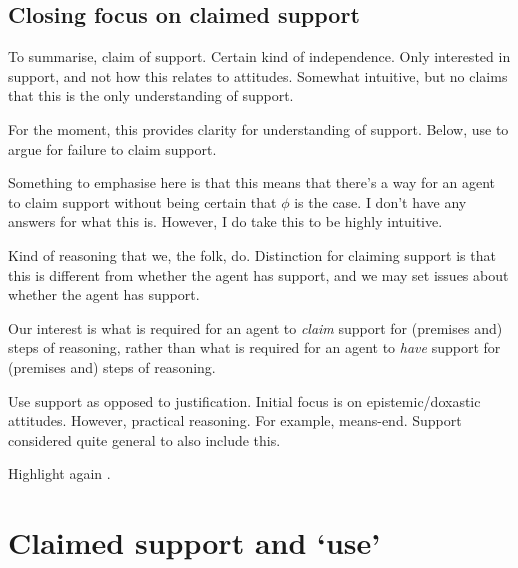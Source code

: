 \subsection{Closing focus on claimed support}

\begin{note}
  To summarise, claim of support.
  Certain kind of independence.
  Only interested in support, and not how this relates to attitudes.
  Somewhat intuitive, but no claims that this is the only understanding of support.

  For the moment, this provides clarity for understanding of support.
  Below, use to argue for failure to claim support.
\end{note}

\begin{note}
  \color{red}
  Something to emphasise here is that this means that there's a way for an agent to claim support without being certain that \(\phi\) is the case.
  I don't have any answers for what this is.
  However, I do take this to be highly intuitive.
\end{note}


\begin{note}[Adequate]
  Kind of reasoning that we, the folk, do.
  Distinction for claiming support is that this is different from whether the agent has support, and we may set issues about whether the agent has support.

  Our interest is what is required for an agent to \emph{claim} support for (premises and) steps of reasoning, rather than what is required for an agent to \emph{have} support for (premises and) steps of reasoning.

  Use support as opposed to justification.
  Initial focus is on epistemic/doxastic attitudes.
  However, practical reasoning.
  For example, means-end.
  Support considered quite general to also include this.
\end{note}

\begin{note}
  Highlight again .
\end{note}

\section{Claimed support and `use'}
\label{sec:claimed-support-use}

